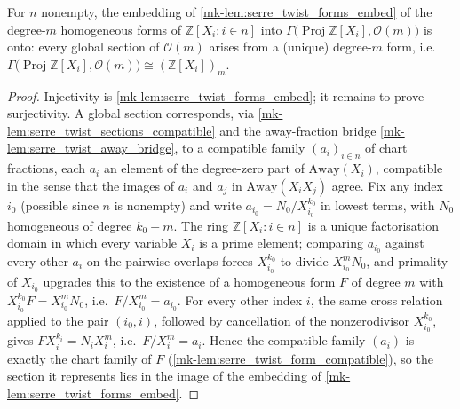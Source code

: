 \begin{lemma}\label{mk-lem:serre_twist_sections}
  \leanok

  For \(n\) nonempty, the embedding of \ref{mk-lem:serre_twist_forms_embed} of
  the degree-\(m\) homogeneous forms of \(\mathbb Z[X_i : i \in n]\) into
  \(\Gamma\bigl(\operatorname{Proj}\mathbb Z[X_i], \mathcal O(m)\bigr)\) is
  onto: every global section of \(\mathcal O(m)\) arises from a (unique)
  degree-\(m\) form, i.e.
  \(\Gamma\bigl(\operatorname{Proj}\mathbb Z[X_i], \mathcal O(m)\bigr)
  \cong (\mathbb Z[X_i])_m\).
\end{lemma}
\begin{proof}
  \leanok{}
  Injectivity is \ref{mk-lem:serre_twist_forms_embed}; it remains to prove
  surjectivity. A global section corresponds, via
  \ref{mk-lem:serre_twist_sections_compatible} and the away-fraction bridge
  \ref{mk-lem:serre_twist_away_bridge}, to a compatible family
  \((a_i)_{i \in n}\) of chart fractions, each \(a_i\) an element of the
  degree-zero part of \(\mathrm{Away}(X_i)\), compatible in the sense
  that the images of \(a_i\) and \(a_j\) in \(\mathrm{Away}(X_i X_j)\)
  agree. Fix any index \(i_0\) (possible since \(n\) is nonempty) and
  write \(a_{i_0} = N_0/X_{i_0}^{k_0}\) in lowest terms, with \(N_0\)
  homogeneous of degree \(k_0 + m\). The ring \(\mathbb Z[X_i : i \in n]\)
  is a unique factorisation domain in which every variable \(X_i\) is a
  prime element; comparing \(a_{i_0}\) against every other \(a_i\) on the
  pairwise overlaps forces \(X_{i_0}^{k_0}\) to divide \(X_{i_0}^m N_0\),
  and primality of \(X_{i_0}\) upgrades this to the existence of a
  homogeneous form \(F\) of degree \(m\) with
  \(X_{i_0}^{k_0} F = X_{i_0}^m N_0\), i.e.\ \(F/X_{i_0}^m = a_{i_0}\).
  For every other index \(i\), the same cross relation applied to the
  pair \((i_0, i)\), followed by cancellation of the nonzerodivisor
  \(X_{i_0}^{k_0}\), gives \(F X_i^{k_i} = N_i X_i^m\), i.e.\
  \(F/X_i^m = a_i\). Hence the compatible family \((a_i)\) is exactly the
  chart family of \(F\) (\ref{mk-lem:serre_twist_form_compatible}), so the
  section it represents lies in the image of the embedding of
  \ref{mk-lem:serre_twist_forms_embed}.
\end{proof}

